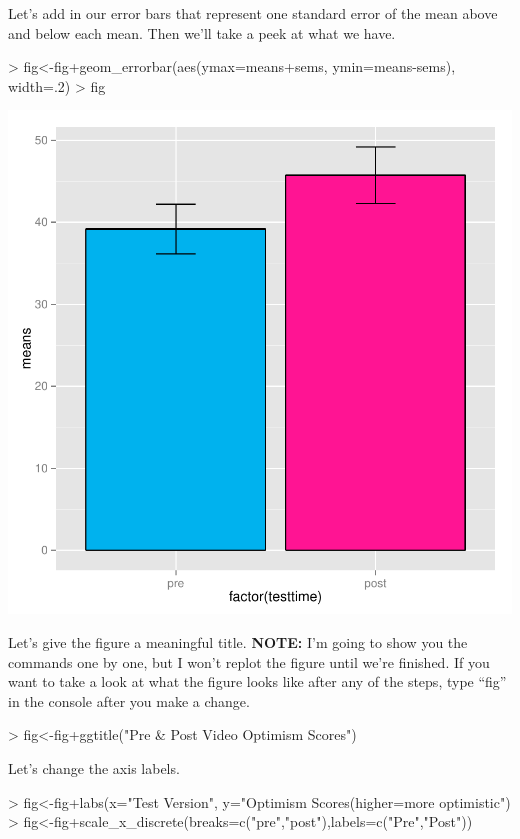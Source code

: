 \documentclass[12pt]{article}
\begin{document}
Let's add in our error bars that represent one standard error of the mean above and below
each mean. Then we'll take a peek at what we have.
\begin{Schunk}
\begin{Sinput}
> fig<-fig+geom_errorbar(aes(ymax=means+sems, ymin=means-sems), width=.2)
> fig
\end{Sinput}
\end{Schunk}
\includegraphics{Reproducibility-048}

Let's give the figure a meaningful title. \textbf{NOTE:} I'm going to show you the commands
one by one, but I won't replot the figure until we're finished. If you want to take a look at
what the figure looks like after any of the steps, type ``fig'' in the console after you make
a change.

\begin{Schunk}
\begin{Sinput}
> fig<-fig+ggtitle("Pre & Post Video Optimism Scores")
\end{Sinput}
\end{Schunk}

Let's change the axis labels.
\begin{Schunk}
\begin{Sinput}
> fig<-fig+labs(x="Test Version", y="Optimism Scores\n(higher=more optimistic")
> fig<-fig+scale_x_discrete(breaks=c("pre","post"),labels=c("Pre","Post"))
\end{Sinput}
\end{Schunk}
\end{document}
